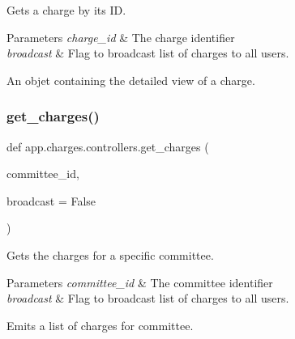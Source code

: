 Gets a charge by its ID. 


\begin{DoxyParams}{Parameters}
{\em charge\+\_\+id} & The charge identifier \\
\hline
{\em broadcast} & Flag to broadcast list of charges to all users.\\
\hline
\end{DoxyParams}
An objet containing the detailed view of a charge. \mbox{\label{namespaceapp_1_1charges_1_1controllers_a30141a884cf96a10060458e66e74aca9}} 
\subsubsection{\texorpdfstring{get\+\_\+charges()}{get\_charges()}}
{\footnotesize\ttfamily def app.\+charges.\+controllers.\+get\+\_\+charges (\begin{DoxyParamCaption}\item[{}]{committee\+\_\+id,  }\item[{}]{broadcast = {\ttfamily False} }\end{DoxyParamCaption})}



Gets the charges for a specific committee. 


\begin{DoxyParams}{Parameters}
{\em committee\+\_\+id} & The committee identifier \\
\hline
{\em broadcast} & Flag to broadcast list of charges to all users.\\
\hline
\end{DoxyParams}
Emits a list of charges for committee. 